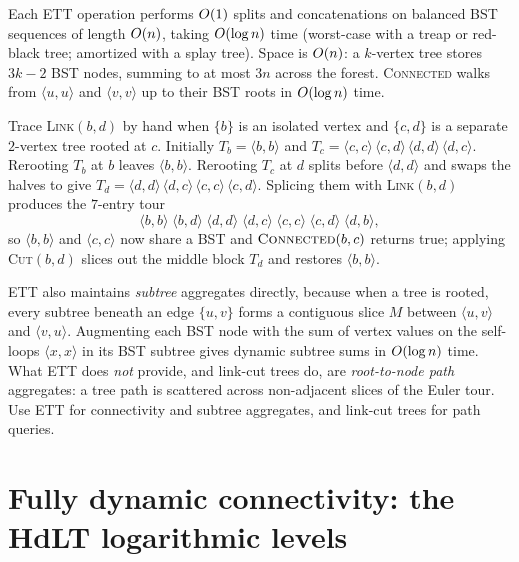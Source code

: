 \begin{complexitybox}
Each ETT operation performs $O(1)$ splits and concatenations on balanced BST sequences
of length $O(n)$, taking $O(\log n)$ time (worst-case with a treap or red-black
tree; amortized with a splay tree). Space is $O(n)$: a $k$-vertex tree stores $3k-2$
BST nodes, summing to at most $3n$ across the forest. \textsc{Connected} walks from
$\langle u,u\rangle$ and $\langle v,v\rangle$ up to their BST roots in $O(\log n)$ time.
\end{complexitybox}

\begin{labbox}
Trace \textsc{Link}$(b,d)$ by hand when $\{b\}$ is an isolated vertex and $\{c,d\}$ is
a separate $2$-vertex tree rooted at $c$. Initially $T_b = \langle b,b\rangle$ and
$T_c = \langle c,c\rangle\,\langle c,d\rangle\,\langle d,d\rangle\,\langle d,c\rangle$.
Rerooting $T_b$ at $b$ leaves $\langle b,b\rangle$. Rerooting $T_c$ at $d$ splits
before $\langle d,d\rangle$ and swaps the halves to give
$T_d = \langle d,d\rangle\,\langle d,c\rangle\,\langle c,c\rangle\,\langle c,d\rangle$.
Splicing them with \textsc{Link}$(b,d)$ produces the $7$-entry tour
\[
  \langle b,b\rangle\;\langle b,d\rangle\;\langle d,d\rangle\;\langle d,c\rangle\;
  \langle c,c\rangle\;\langle c,d\rangle\;\langle d,b\rangle,
\]
so $\langle b,b\rangle$ and $\langle c,c\rangle$ now share a BST and
$\textsc{Connected}(b,c)$ returns true; applying \textsc{Cut}$(b,d)$ slices out the
middle block $T_d$ and restores $\langle b,b\rangle$.
\end{labbox}

\begin{aestheticbox}
ETT also maintains \emph{subtree} aggregates directly, because when a tree is rooted,
every subtree beneath an edge $\{u,v\}$ forms a contiguous slice $M$ between
$\langle u,v\rangle$ and $\langle v,u\rangle$. Augmenting each BST node with the sum of
vertex values on the self-loops $\langle x,x\rangle$ in its BST subtree gives dynamic
subtree sums in $O(\log n)$ time. What ETT does \emph{not} provide, and link-cut trees
do, are \emph{root-to-node path} aggregates: a tree path is scattered across non-adjacent
slices of the Euler tour. Use ETT for connectivity and subtree aggregates, and link-cut
trees for path queries.
\end{aestheticbox}

\section{Fully dynamic connectivity: the HdLT logarithmic levels}
\label{ch39:hdlt}

